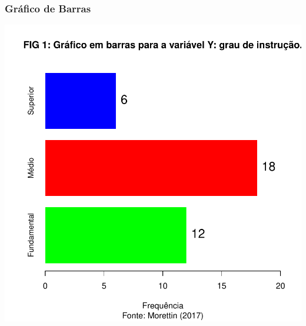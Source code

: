 \documentclass[14pt,aspectratio=1610]{beamer}
\begin{document}
\begin{frame}{}
\frametitle{Gráfico de Barras}
\begin{block}{}
\begin{center}
\includegraphics{Aula4-bpHorizontal}
\end{center}
\end{block}
\end{frame}

\end{document}
